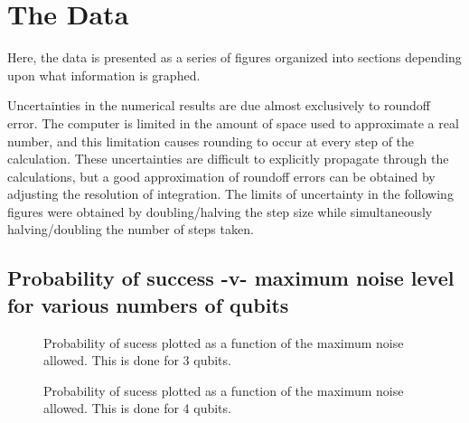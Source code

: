 \chapter{The Data}
\label{chap:data}
%

\newlength{\dataheight}
\setlength{\dataheight}{4in}
\newlength{\datawidth}
\setlength{\datawidth}{4.5in}

Here, the data is presented as a series of figures organized
into sections depending upon what information is graphed.

Uncertainties in the numerical results are due almost exclusively
to roundoff error.  The computer is limited in the amount of space
used to approximate a real number, and this limitation causes rounding
to occur at every step of the calculation.  These uncertainties
are difficult to explicitly propagate through the calculations, but
a good approximation of roundoff errors can be obtained by adjusting
the resolution of integration.  The limits of uncertainty in the
following figures were obtained by doubling/halving the step size
while simultaneously halving/doubling the number of steps taken.

\pagebreak

\section{Probability of success -v- maximum noise level for various
numbers of qubits}



%
\begin{figure}[h]
\begin{center}
\end{center}
\caption{Probability of sucess plotted as a function of the maximum noise allowed.
This is done for 3 qubits.}
\end{figure}

\pagebreak

\begin{figure}[h]
\begin{center}
\end{center}
\caption{Probability of sucess plotted as a function of the maximum noise allowed.
This is done for 4 qubits.}
\end{figure}

